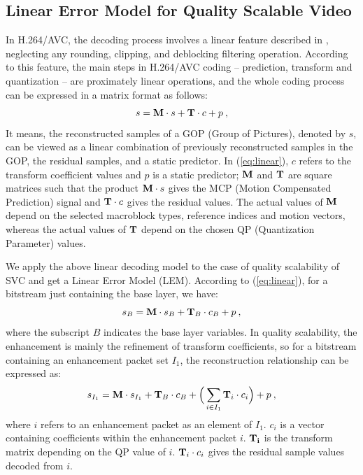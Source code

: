 \documentclass[journal]{IEEEtran}
\begin{document}
\subsection{Linear Error Model for Quality Scalable Video}
\label{sec:model}

In H.264/AVC, the decoding process involves a linear feature described in \cite{Winken08}, neglecting any rounding, clipping, and deblocking filtering operation. According to this feature, the main steps in H.264/AVC coding -- prediction, transform and quantization -- are proximately linear operations, and the whole coding process can be expressed in a matrix format as follows:
\begin{equation}
\label{eq:linear}
s = {\rm\bf M} \cdot s + {\rm\bf T} \cdot c + p \: ,
\end{equation}
It means, the reconstructed samples of a GOP (Group of Pictures), denoted by $s$, can be viewed as a linear combination of previously reconstructed samples in the GOP, the residual samples, and a static predictor. In (\ref{eq:linear}), $c$ refers to the transform coefficient values and $p$ is a static predictor; ${\rm\bf M}$ and ${\rm\bf T}$ are square matrices such that the product ${\rm\bf M} \cdot s$ gives the MCP (Motion Compensated Prediction) signal and ${\rm\bf T} \cdot c$ gives the residual values. The actual values of ${\rm\bf M}$ depend on the selected macroblock types, reference indices and motion vectors, whereas the actual values of ${\rm\bf T}$ depend on the chosen QP (Quantization Parameter) values.

We apply the above linear decoding model to the case of quality scalability of SVC and get a Linear Error Model (LEM). According to (\ref{eq:linear}), for a bitstream just containing the base layer, we have:
\begin{equation}
\label{eq:base0}
s_{B} = {\rm\bf M} \cdot s_{B} + {\rm\bf T}_{B} \cdot c_{B} + p \: ,
\end{equation}
where the subscript $B$ indicates the base layer variables. In quality scalability, the enhancement is mainly the refinement of transform coefficients, so for a bitstream containing an enhancement packet set $I_1$, the reconstruction relationship can be expressed as:
\begin{equation}
\label{eq:subset1}
s_{I_1} = {\rm\bf M} \cdot s_{I_1} + {\rm\bf T}_{B} \cdot c_{B} + \Big( \sum_{i \in I_1}{\rm\bf T}_i \cdot c_i \Big) + p \: ,
\end{equation}
where $i$ refers to an enhancement packet as an element of $I_1$. $c_i$ is a vector containing coefficients within the enhancement packet $i$. ${\rm\bf T_i}$ is the transform matrix depending on the QP value of $i$. ${\rm\bf T}_i \cdot c_i$ gives the residual sample values decoded from $i$.
\end{document}
